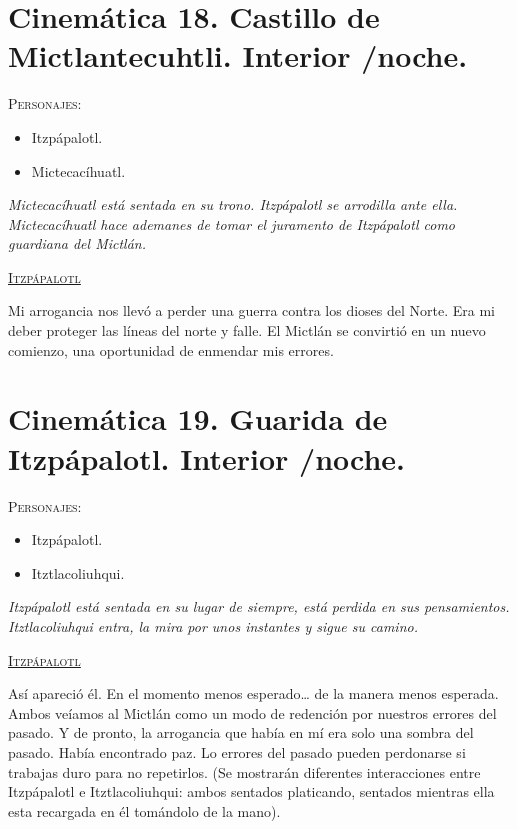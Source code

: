 \documentclass[11pt,letterpaper]{article}
\begin{document}
\section{Cinemática 18. Castillo de Mictlantecuhtli. Interior /noche.}
\textsc{Personajes}:
\begin{itemize}
	\item Itzpápalotl.
	\item Mictecacíhuatl.
\end{itemize}

\textit{Mictecacíhuatl está sentada en su trono. Itzpápalotl se arrodilla ante ella. Mictecacíhuatl hace ademanes de tomar el juramento de Itzpápalotl como guardiana del Mictlán.}
\begin{center}
\textsc{\underline{Itzpápalotl}}
\\
\par
Mi arrogancia nos llevó a perder una guerra contra los dioses del Norte. Era mi deber proteger las líneas del norte y falle. El Mictlán se convirtió en un nuevo comienzo, una oportunidad de enmendar mis errores.
\end{center}

\section{Cinemática 19. Guarida de Itzpápalotl. Interior /noche.}
\textsc{Personajes}:
\begin{itemize}
\item Itzpápalotl.
\item Itztlacoliuhqui. 
\end{itemize}
\textit{Itzpápalotl está sentada en su lugar de siempre, está perdida en sus pensamientos. Itztlacoliuhqui entra, la mira por unos instantes y sigue su camino.}
\begin{center}
\textsc{\underline{Itzpápalotl}}
\\
\par
Así apareció él. En el momento menos esperado… de la manera menos esperada. Ambos veíamos al Mictlán como un modo de redención por nuestros errores del pasado. Y de pronto, la arrogancia que había en mí era solo una sombra del pasado. Había encontrado paz. Lo errores del pasado pueden perdonarse si trabajas duro para no repetirlos. (Se mostrarán diferentes interacciones entre Itzpápalotl e Itztlacoliuhqui: ambos sentados platicando, sentados mientras ella esta recargada en él tomándolo de la mano).
\end{center}
\end{document}
